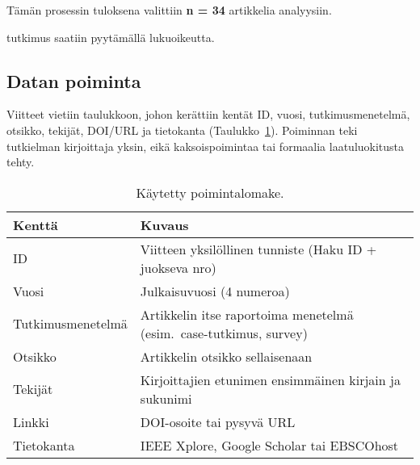 \documentclass[bscthesis,finnish,oneside,biblatex]{uefcsthesis}
\begin{document}
    Tämän prosessin tuloksena valittiin \textbf{n = 34} artikkelia analyysiin.

    \cite{ozdenizci2024mobilizing} tutkimus saatiin pyytämällä lukuoikeutta.


    \subsection{Datan poiminta}
    \label{sec:data-extraction}

    Viitteet vietiin taulukkoon, johon kerättiin kentät ID, vuosi, tutkimusmenetelmä, otsikko, tekijät, DOI/URL ja tietokanta
    (Taulukko~\ref{tab:extractionfields}). Poiminnan teki tutkielman kirjoittaja yksin, eikä kaksoispoimintaa tai formaalia laatuluokitusta tehty.


    \begin{table}[htbp]
        \centering
        \footnotesize
        \caption{Käytetty poimintalomake.}
        \label{tab:extractionfields}
        \begin{tabular}{p{3cm}p{8.5cm}}
            \toprule
            \textbf{Kenttä}     & \textbf{Kuvaus}                                                     \\
            \midrule
            ID                  & Viitteen yksilöllinen tunniste (Haku ID + juokseva nro)             \\
            Vuosi               & Julkaisuvuosi (4 numeroa)                                           \\
            Tutkimus\-menetelmä & Artikkelin itse raportoima menetelmä (esim.\ case-tutkimus, survey) \\
            Otsikko             & Artikkelin otsikko sellaisenaan                                     \\
            Tekijät             & Kirjoittajien etunimen ensimmäinen kirjain ja sukunimi              \\
            Linkki              & DOI-osoite tai pysyvä URL                                           \\
            Tietokanta          & IEEE Xplore, Google Scholar tai EBSCOhost                           \\
            \bottomrule
        \end{tabular}
    \end{table}

\end{document}
